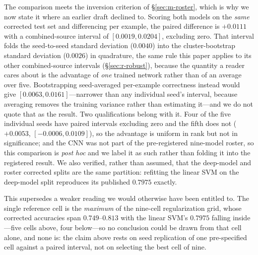 \documentclass[webpdf,modern,large,namedate]{oup-authoring-template}%
\begin{document}
The comparison meets the inversion criterion of \S\ref{sec:m-roster}, which is why we now state it where an earlier draft declined to. Scoring both models on the \emph{same} corrected test set and differencing per example, the paired difference is $+0.0111$ with a combined-source interval of $[0.0019,0.0204]$, excluding zero. That interval folds the seed-to-seed standard deviation ($0.0040$) into the cluster-bootstrap standard deviation ($0.0026$) in quadrature, the same rule this paper applies to its other combined-source intervals (\S\ref{sec:r-robust}), because the quantity a reader cares about is the advantage of \emph{one} trained network rather than of an average over five. Bootstrapping seed-averaged per-example correctness instead would give $[0.0063,0.0161]$---narrower than any individual seed's interval, because averaging removes the training variance rather than estimating it---and we do not quote that as the result. Two qualifications belong with it. Four of the five individual seeds have paired intervals excluding zero and the fifth does not ($+0.0053$, $[-0.0006,0.0109]$), so the advantage is uniform in rank but not in significance; and the CNN was not part of the pre-registered nine-model roster, so this comparison is \emph{post hoc} and we label it as such rather than folding it into the registered result. We also verified, rather than assumed, that the deep-model and roster corrected splits are the same partition: refitting the linear SVM on the deep-model split reproduces its published $0.7975$ exactly.

This supersedes a weaker reading we would otherwise have been entitled to. The single reference cell is the \emph{maximum} of the nine-cell regularization grid, whose corrected accuracies span $0.749$--$0.813$ with the linear SVM's $0.7975$ falling inside---five cells above, four below---so no conclusion could be drawn from that cell alone, and none is: the claim above rests on seed replication of one pre-specified cell against a paired interval, not on selecting the best cell of nine.
\end{document}
